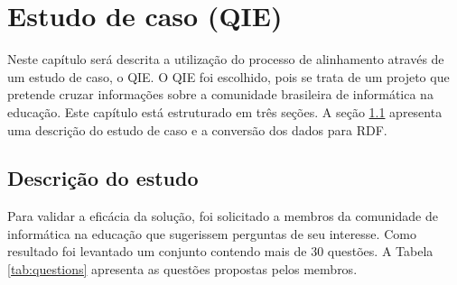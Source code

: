 \chapter{Estudo de caso (QIE)}
\label{cap:estudo}
Neste capítulo será descrita a utilização do processo de alinhamento através de um estudo de caso, o QIE. O QIE foi escolhido, pois se trata de um projeto que pretende cruzar informações sobre a comunidade brasileira de informática na educação. Este capítulo está estruturado em três seções. A seção \ref{sec:estudo_descricao} apresenta uma descrição do estudo de caso e a conversão dos dados para RDF.

\section{Descrição do estudo}
\label{sec:estudo_descricao}
Para validar a eficácia da solução, foi solicitado a membros da comunidade de informática na educação que sugerissem perguntas de seu interesse. Como resultado foi levantado um conjunto contendo mais de 30 questões. A Tabela \ref{tab:questions} apresenta as questões propostas pelos membros.

